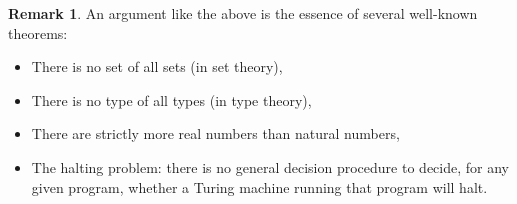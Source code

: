 \documentclass[a4paper]{article}
\theoremstyle{definition}
\newtheorem{remark}[theorem]{Remark}
\begin{document}
\begin{remark}
	An argument like the above is the essence of several well-known theorems:
	\begin{itemize}
		\item There is no set of all sets (in set theory),
		\item There is no type of all types (in type theory),
		\item There are strictly more real numbers than natural numbers,
		\item The halting problem: there is no general decision procedure to decide, for any given program, whether a Turing machine running that program will halt.
	\end{itemize}
\end{remark}



\end{document}
